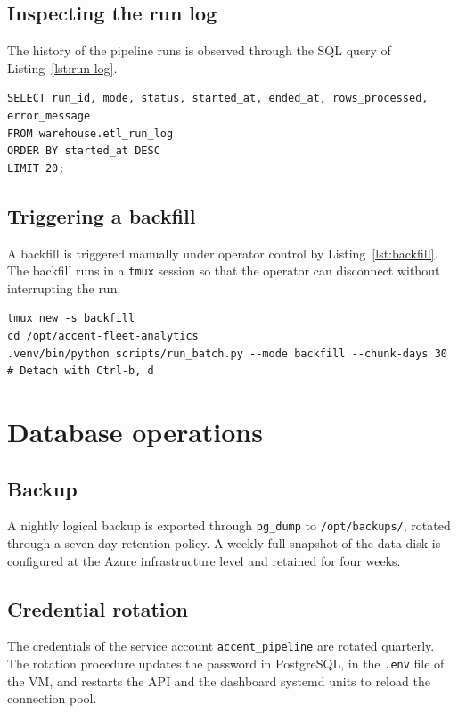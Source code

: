 \subsection{Inspecting the run log}
The history of the pipeline runs is observed through the SQL query of Listing~\ref{lst:run-log}.

\begin{lstlisting}[style=sql,caption={Inspecting the run log.},label={lst:run-log}]
SELECT run_id, mode, status, started_at, ended_at, rows_processed, error_message
FROM warehouse.etl_run_log
ORDER BY started_at DESC
LIMIT 20;
\end{lstlisting}

\subsection{Triggering a backfill}
A backfill is triggered manually under operator control by Listing~\ref{lst:backfill}. The backfill runs in a \texttt{tmux} session so that the operator can disconnect without interrupting the run.

\begin{lstlisting}[style=bash,caption={Triggering a chunked backfill.},label={lst:backfill}]
tmux new -s backfill
cd /opt/accent-fleet-analytics
.venv/bin/python scripts/run_batch.py --mode backfill --chunk-days 30
# Detach with Ctrl-b, d
\end{lstlisting}

\section{Database operations}

\subsection{Backup}
A nightly logical backup is exported through \texttt{pg\_dump} to \texttt{/opt/backups/}, rotated through a seven-day retention policy. A weekly full snapshot of the data disk is configured at the Azure infrastructure level and retained for four weeks.

\subsection{Credential rotation}
The credentials of the service account \texttt{accent\_pipeline} are rotated quarterly. The rotation procedure updates the password in PostgreSQL, in the \texttt{.env} file of the VM, and restarts the API and the dashboard systemd units to reload the connection pool.

